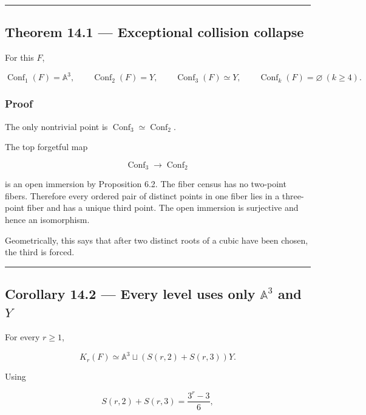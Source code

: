 \begin{center}\rule{0.5\linewidth}{0.5pt}\end{center}

\subsection{Theorem 14.1 --- Exceptional collision
collapse}\label{theorem-14.1-exceptional-collision-collapse}

For this \(F\),

\[
\operatorname{Conf}_1(F)=\mathbb A^3,
\qquad
\operatorname{Conf}_2(F)=Y,
\qquad
\operatorname{Conf}_3(F)\simeq Y,
\qquad
\operatorname{Conf}_k(F)=\varnothing\ (k\ge4).
\]

\subsubsection{Proof}\label{proof-7}

The only nontrivial point is
\(\operatorname{Conf}_3\simeq\operatorname{Conf}_2\).

The top forgetful map

\[
\operatorname{Conf}_3\to\operatorname{Conf}_2
\]

is an open immersion by Proposition 6.2. The fiber census has no
two-point fibers. Therefore every ordered pair of distinct points in one
fiber lies in a three-point fiber and has a unique third point. The open
immersion is surjective and hence an isomorphism.

Geometrically, this says that after two distinct roots of a cubic have
been chosen, the third is forced.

\begin{center}\rule{0.5\linewidth}{0.5pt}\end{center}

\subsection{\texorpdfstring{Corollary 14.2 --- Every level uses only
\(\mathbb A^3\) and
\(Y\)}{Corollary 14.2 --- Every level uses only \textbackslash mathbb A\^{}3 and Y}}\label{corollary-14.2-every-level-uses-only-mathbb-a3-and-y}

For every \(r\ge1\),

\[
K_r(F)
\simeq
\mathbb A^3
\sqcup
\left(S(r,2)+S(r,3)\right)Y.
\]

Using

\[
S(r,2)+S(r,3)=\frac{3^r-3}{6},
\]

